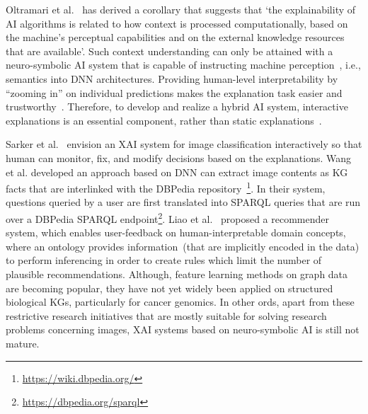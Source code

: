 \hspace*{3.5mm} Oltramari et al.~\cite{oltramari2020neuro} has derived a corollary that suggests that `the explainability of AI algorithms is related to how context is processed computationally, based on the machine's perceptual capabilities and on the external knowledge resources that are available'. Such context understanding can only be attained with a neuro-symbolic AI system that is capable of instructing machine perception~\cite{oltramari2020neuro}, i.e., semantics into DNN architectures. %
Providing human-level interpretability by ``zooming in'' on individual predictions makes the explanation task easier and trustworthy~\cite{ribeiro2018anchors}. Therefore, to develop and realize a hybrid AI system, interactive explanations is an essential component, rather than static explanations~\cite{futia2020integration}. %

\hspace*{3.5mm} Sarker et al.~\cite{sarker2017explaining} envision an XAI system for image classification interactively so that human can monitor, fix, and modify decisions based on the explanations. Wang et al.\cite{wang2015explicit} developed an approach based on DNN can extract image contents as KG facts that are interlinked with the DBPedia repository~\cite{lehmann2015dbpedia}\footnote{\url{https://wiki.dbpedia.org/}}. In their system, questions queried by a user are first translated into SPARQL queries that are run over a DBPedia SPARQL endpoint\footnote{\url{https://dbpedia.org/sparql}}. Liao et al.~\cite{liao2018interpretable} proposed a recommender system, which enables user-feedback on human-interpretable domain concepts, where an ontology  provides information~(that are implicitly encoded in the data) to perform inferencing in order to create rules which limit the number of plausible recommendations. 
Although, feature learning methods on graph data are becoming popular, they have not yet widely been applied on structured biological KGs, particularly for cancer genomics. In other ords, apart from these restrictive research initiatives that are mostly suitable for solving research problems concerning images, XAI systems based on neuro-symbolic AI is still not mature. %


